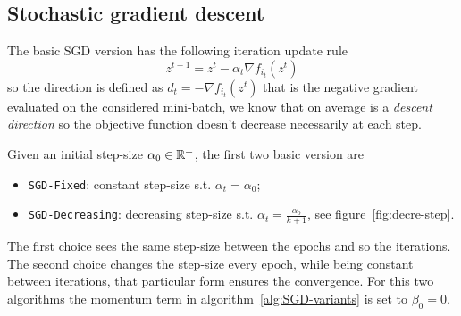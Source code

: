 


\subsection{Stochastic gradient descent}\label{subsc:sgd}

The basic SGD version has the following iteration update rule
\begin{equation}\label{eq:sgd-base}
z^{t+1}=z^t-\alpha_t\nabla f_{i_t}(z^t)
\end{equation}
so the direction is defined as $d_t=-\nabla f_{i_t}(z^t)$ that is the negative gradient evaluated on the considered mini-batch, we know that on average is a \emph{descent direction} so the objective function doesn't decrease necessarily at each step.

Given an initial step-size $\alpha_0\in\mathbb{R}^+$, the first two basic version are 
\begin{itemize}
\item \texttt{SGD-Fixed}: constant step-size s.t. $\alpha_t=\alpha_0$;
\item \texttt{SGD-Decreasing}: decreasing step-size s.t. $\alpha_t=\frac{\alpha_0}{k+1}$, see figure~\vref{fig:decre-step}.
\end{itemize}
The first choice sees the same step-size between the epochs and so the iterations. The second choice changes the step-size every epoch, while being constant between iterations, that particular form ensures the convergence. For this two algorithms the momentum term in algorithm~\ref{alg:SGD-variants} is set to $\beta_0=0$.

